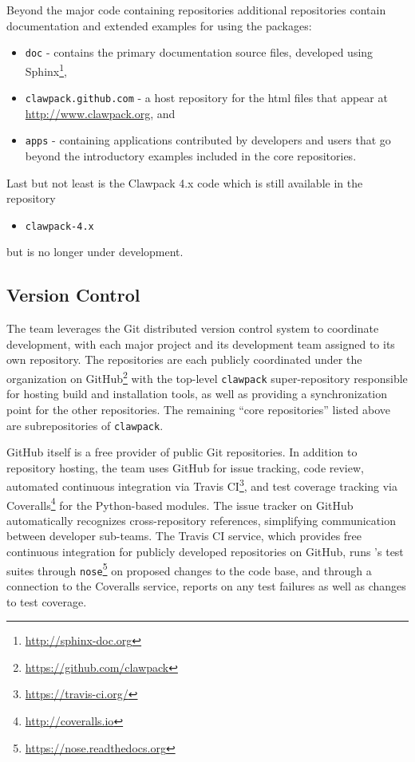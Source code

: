 Beyond the major code containing repositories additional repositories contain
documentation and extended examples for using the packages:
\begin{itemize}
    \item \texttt{doc} - contains the primary documentation source files,
    developed using
Sphinx\footnote{\url{http://sphinx-doc.org}},
    \item \texttt{clawpack.github.com} - a host repository for the html files
    that appear at \url{http://www.clawpack.org}, and
    \item \texttt{apps} - containing applications contributed by developers and
    users that go beyond the introductory examples included in the core
    repositories.
\end{itemize}
Last but not least is the Clawpack 4.x code which is still available in the
repository
\begin{itemize}
    \item \texttt{clawpack-4.x}
\end{itemize}
but is no longer under development.


\subsection{Version Control}

The \clawpack team leverages the Git distributed version control system
to coordinate development, with each major project and its development
team assigned to its own repository.  The repositories are each
publicly coordinated under the \clawpack organization on
GitHub\footnote{\url{https://github.com/clawpack}} with the
top-level \texttt{clawpack} super-repository responsible for hosting
build and installation tools, as well as providing a synchronization
point for the other repositories.  The remaining ``core \clawpack repositories''
listed above are subrepositories of \texttt{clawpack}.

GitHub itself is a free provider of public Git repositories.  In addition to
repository hosting, the \clawpack team uses GitHub for issue tracking,
code review, automated continuous integration via Travis CI\footnote{\url{https://travis-ci.org/}},
and test coverage tracking via Coveralls\footnote{\url{http://coveralls.io}}
for the Python-based modules.  The issue tracker on
GitHub automatically recognizes cross-repository references,
simplifying communication between \clawpack developer sub-teams.  The
Travis CI service, which provides free continuous integration for
publicly developed repositories on GitHub, runs \clawpack's test
suites through \texttt{nose}\footnote{\url{https://nose.readthedocs.org}}
on proposed changes
to the code base, and through a connection to the Coveralls service,
reports on any test failures as well as changes to test coverage.

